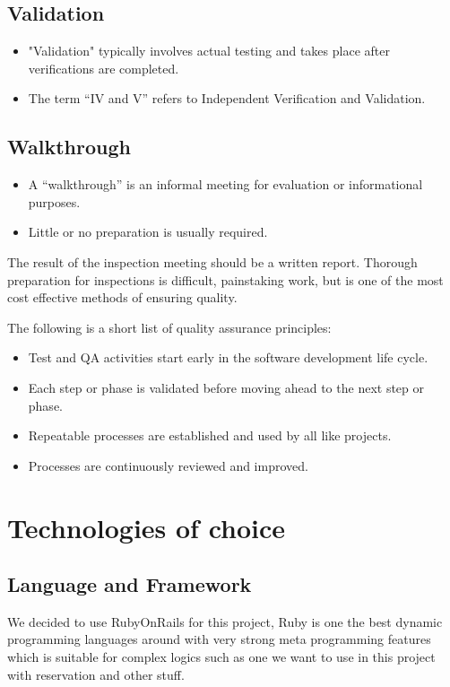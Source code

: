 \documentclass[a4paper,12pt]{article}
\begin{document}
\subsection*{Validation}
\begin{itemize}
\item{"Validation" typically involves actual testing and takes place after verifications are completed.}
\item{The term “IV and V” refers to Independent Verification and Validation.}
\end{itemize}

\subsection*{Walkthrough}
\begin{itemize}
\item{A “walkthrough” is an informal meeting for evaluation or informational purposes.}
\item{Little or no preparation is usually required.}
\end{itemize}

The result of the inspection meeting should be a written report. Thorough preparation for
inspections is difficult, painstaking work, but is one of the most cost effective methods
of ensuring quality.

The following is a short list of quality assurance principles:
\begin{itemize}
\item{Test and QA activities start early in the software development life cycle.}
\item{Each step or phase is validated before moving ahead to the next step or phase.}
\item{Repeatable processes are established and used by all like projects.}
\item{Processes are continuously reviewed and improved.}
\end{itemize}


\section*{Technologies of choice}
\subsection*{Language and Framework}
We decided to use RubyOnRails for this project, Ruby is one the best dynamic programming
languages around with very strong meta programming features which is suitable for complex
logics such as one we want to use in this project with reservation and other stuff.
\end{document}
